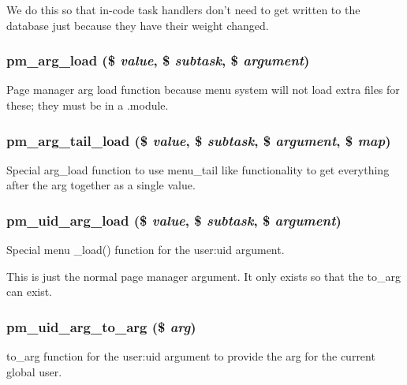 We do this so that in-\/code task handlers don't need to get written to the database just because they have their weight changed. \hypertarget{page__manager_8module_afb6c50228189e10200373039a7a703ee}{
\subsubsection[{pm\_\-arg\_\-load}]{\setlength{\rightskip}{0pt plus 5cm}pm\_\-arg\_\-load (\$ {\em value}, \/  \$ {\em subtask}, \/  \$ {\em argument})}}
\label{page__manager_8module_afb6c50228189e10200373039a7a703ee}
Page manager arg load function because menu system will not load extra files for these; they must be in a .module. \hypertarget{page__manager_8module_a247a1c4742c19716ce79077b7c526b00}{
\subsubsection[{pm\_\-arg\_\-tail\_\-load}]{\setlength{\rightskip}{0pt plus 5cm}pm\_\-arg\_\-tail\_\-load (\$ {\em value}, \/  \$ {\em subtask}, \/  \$ {\em argument}, \/  \$ {\em map})}}
\label{page__manager_8module_a247a1c4742c19716ce79077b7c526b00}
Special arg\_\-load function to use menu\_\-tail like functionality to get everything after the arg together as a single value. \hypertarget{page__manager_8module_a4a9755f49b3bbb286b8643a352eada60}{
\subsubsection[{pm\_\-uid\_\-arg\_\-load}]{\setlength{\rightskip}{0pt plus 5cm}pm\_\-uid\_\-arg\_\-load (\$ {\em value}, \/  \$ {\em subtask}, \/  \$ {\em argument})}}
\label{page__manager_8module_a4a9755f49b3bbb286b8643a352eada60}
Special menu \_\-load() function for the user:uid argument.

This is just the normal page manager argument. It only exists so that the to\_\-arg can exist. \hypertarget{page__manager_8module_a3f58e1c475005eec131f1648a4bf245e}{
\subsubsection[{pm\_\-uid\_\-arg\_\-to\_\-arg}]{\setlength{\rightskip}{0pt plus 5cm}pm\_\-uid\_\-arg\_\-to\_\-arg (\$ {\em arg})}}
\label{page__manager_8module_a3f58e1c475005eec131f1648a4bf245e}
to\_\-arg function for the user:uid argument to provide the arg for the current global user. 